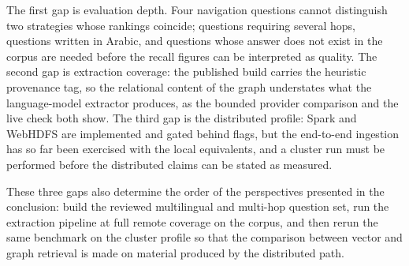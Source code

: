 The first gap is evaluation depth. Four navigation questions cannot distinguish two strategies whose rankings coincide; questions requiring several hops, questions written in Arabic, and questions whose answer does not exist in the corpus are needed before the recall figures can be interpreted as quality. The second gap is extraction coverage: the published build carries the heuristic provenance tag, so the relational content of the graph understates what the language-model extractor produces, as the bounded provider comparison and the live check both show. The third gap is the distributed profile: Spark and WebHDFS are implemented and gated behind flags, but the end-to-end ingestion has so far been exercised with the local equivalents, and a cluster run must be performed before the distributed claims can be stated as measured.

These three gaps also determine the order of the perspectives presented in the conclusion: build the reviewed multilingual and multi-hop question set, run the extraction pipeline at full remote coverage on the corpus, and then rerun the same benchmark on the cluster profile so that the comparison between vector and graph retrieval is made on material produced by the distributed path.
